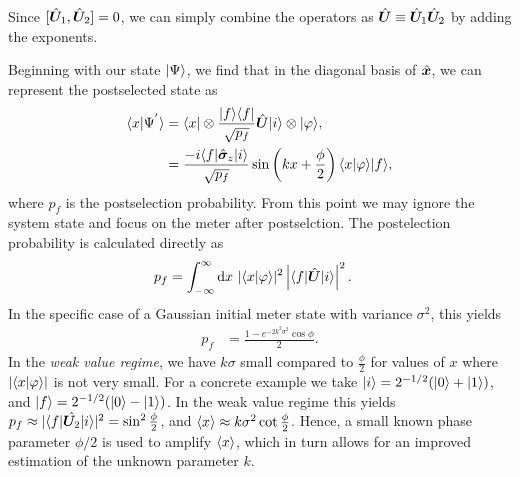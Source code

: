 Since $[\hat{\bm U}_1, \hat{\bm U}_2] = 0$, we can simply combine the operators as $\hat{\bm U} \equiv \hat{\bm U}_1 \hat{\bm U}_2$ by adding the exponents.

Beginning with our state $\lvert \Psi\rangle$, we find that in the diagonal basis of $\hat{\bm x}$, we can represent the postselected state as 
\begin{align}\label{eq: general postselected state}
	\nonumber \langle x \vert \Psi^{'} \rangle &= \langle x \rvert \otimes \frac{\lvert f\rangle\langle f \rvert}{\sqrt{p_f}} \hat{\bm U} \lvert i\rangle \otimes \lvert \varphi\rangle, \\
	&= \frac{-i \langle f \rvert\hat{\bm \sigma}_z \lvert i\rangle}{\sqrt{p_f}} \sin \left(k x + \frac{\phi}{2}\right) \langle x \vert \varphi \rangle \lvert f\rangle,
\end{align}
where $p_f$ is the postselection probability.  From this point we may ignore the system state and focus on the meter after postselction.  The postelection probability is calculated directly as 
\begin{align}
	p_f &= \int_{-\infty}^{\infty} \text{d}x~ |\langle x \vert \varphi \rangle|^2 \left|\langle f \rvert\hat{\bm U} \lvert i\rangle\right|^2.
\end{align} 
In the specific case of a Gaussian initial meter state with variance $\sigma^2$, this yields 
\begin{align}\label{eq:postselection probability}
	p_f &= \frac{1 -  e^{-2k^2\sigma^2}\cos\phi}{2}.
\end{align}
In the \emph{weak value regime}, we have $k\sigma$ small compared to $\frac{\phi}{2}$ for values of $x$ where $|\langle x \vert \varphi \rangle|$ is not very small.  For a concrete example we take $\lvert i\rangle = 2^{-1/2}(\lvert 0\rangle + \lvert 1\rangle)$, and  $\lvert f\rangle = 2^{-1/2}(\lvert 0\rangle - \lvert 1\rangle)$.  In the weak value regime this yields $p_f \approx |\langle f \rvert\hat{\bm U_2}\lvert i\rangle|^2 =\sin^2 \frac{\phi}{2}$, and $\left\langle x \right\rangle \approx k \sigma^2 \cot \frac{\phi}{2}$.  Hence, a small known phase parameter $\phi/2$ is used to amplify $\left\langle x \right\rangle$, which in turn allows for an improved estimation of the unknown parameter $k$.

